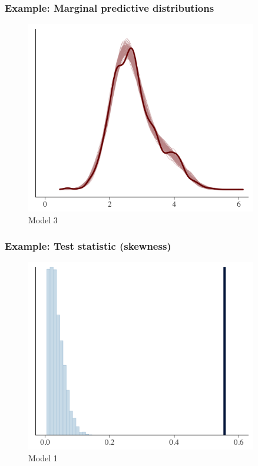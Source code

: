 \documentclass[10pt]{beamer}
\begin{document}
\begin{frame}
\frametitle{Example: Marginal predictive distributions}

\begin{figure}
\centering
\includegraphics[width=0.9\textwidth]{figs/ppc_dens3.png}
\caption{Model 3}
\end{figure}

\end{frame}


\begin{frame}
\frametitle{Example: Test statistic (skewness)}

\begin{figure}
\centering
\includegraphics[width=0.9\textwidth]{figs/ppc_skew1.png}
\caption{Model 1}
\end{figure}

\end{frame}
\end{document}
